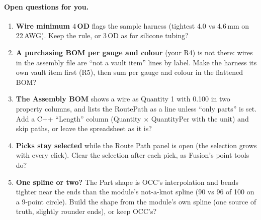 \paragraph{Open questions for you.}
\begin{enumerate}[nosep]
  \item \textbf{Wire minimum $4\,$OD} flags the sample harness (tightest 4.0 vs 4.6\,mm on 22\,AWG). Keep the rule, or
        $3\,$OD as for silicone tubing?
  \item \textbf{A purchasing BOM per gauge and colour} (your R4) is not there: wires in the assembly file are ``not a
        vault item'' lines by label. Make the harness its own vault item first (R5), then sum per gauge and colour in
        the flattened BOM?
  \item \textbf{The Assembly BOM} shows a wire as Quantity 1 with  0.100 in two property columns,
        and lists the RoutePath as a line unless ``only parts'' is set. Add a C++ ``Length'' column
        (Quantity $\times$ QuantityPer with the unit) and skip paths, or leave the spreadsheet as it is?
  \item \textbf{Picks stay selected} while the Route Path panel is open (the selection grows with every click).
        Clear the selection after each pick, as Fusion's point tools do?
  \item \textbf{One spline or two?} The Part shape is OCC's interpolation and bends tighter near the ends than the
        module's not-a-knot spline (90 vs 96 of 100 on a 9-point circle). Build the shape from the module's own
        spline (one source of truth, slightly rounder ends), or keep OCC's?
\end{enumerate}
